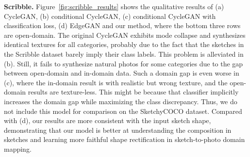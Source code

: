 \documentclass[10pt,twocolumn,letterpaper]{article}
\begin{document}
\noindent \textbf{Scribble.}  Figure~\ref{fig:scribble_results} shows the qualitative results of (a) CycleGAN, (b) conditional CycleGAN, (c) conditional CycleGAN with classification loss, (d) EdgeGAN and our method, where the bottom three rows are open-domain. The original CycleGAN exhibits mode collapse and synthesizes identical textures for all categories, probably due to the fact that the sketches in the Scribble dataset barely imply their class labels. This problem is alleviated in (b). Still, it fails to synthesize natural photos for some categories due to the gap between open-domain and in-domain data. Such a domain gap is even worse in (c), where the in-domain result is with realistic but wrong texture, and the open-domain results are texture-less. This might be because that classifier implicitly increases the domain gap while maximizing the class discrepancy. Thus, we do not include this model for comparison on the SketchyCOCO dataset. Compared with (d), our results are more consistent with the input sketch shape, demonstrating that our model is better at understanding the composition in sketches and learning more faithful shape rectification in sketch-to-photo domain mapping.
\end{document}
